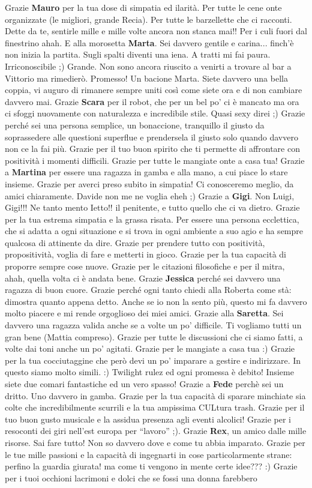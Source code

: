\documentclass[10pt]{amsart}
\newcommand{\n}[1]{{\Large \bf #1}}
\begin{document}
Grazie \n{Mauro} per la tua dose di simpatia ed ilarità. Per tutte le cene onte organizzate (le migliori, grande Recia). Per tutte le barzellette che ci racconti. Dette da te, sentirle mille e mille volte ancora non stanca mai!! Per i culi fuori dal finestrino ahah. E alla morosetta \n{Marta}. Sei davvero gentile e carina... finch'è non inizia la partita. Sugli spalti diventi una iena. A tratti mi fai paura. Irriconoscibile ;) Grande. Non sono ancora riuscito a venirti a trovare al bar a Vittorio ma rimedierò. Promesso! Un bacione Marta. Siete davvero una bella coppia, vi auguro di rimanere sempre uniti così come siete ora e di non cambiare davvero mai. 
Grazie \n{Scara} per il robot, che per un bel po' ci è mancato ma ora  ci sfoggi nuovamente con naturalezza e incredibile stile. Quasi sexy direi ;) Grazie perché sei una persona semplice, un bonaccione, tranquillo il giusto da soprassedere alle questioni superflue e prendersela il giusto solo quando davvero non ce la fai più. Grazie per il tuo buon spirito che ti permette di affrontare con positività i momenti difficili. Grazie per tutte le mangiate onte a casa tua! Grazie a \n{Martina} per essere una ragazza in gamba e alla mano, a cui piace lo stare insieme. Grazie per averci preso subito in simpatia! Ci conosceremo meglio, da amici chiaramente. Davide non me ne voglia eheh ;) Grazie a \n{Gigi}. Non Luigi, Gigi!!! Ne tanto mento Ietto!! il penitente, e tutto quello che ci va dietro. Grazie per la tua estrema simpatia e la grassa risata. Per essere una persona ecclettica, che si adatta a ogni situazione e si trova in ogni ambiente a suo agio e ha sempre qualcosa di attinente da dire. Grazie per prendere tutto con positività, propositività, voglia di fare e metterti in gioco. Grazie per la tua capacità di proporre sempre cose nuove. Grazie per le citazioni filosofiche e per il mitra, ahah, quella volta ci è andata bene.  Grazie \n{Jessica} perché sei davvero una ragazza di buon cuore. Grazie perché ogni tanto chiedi alla Roberta come stà: dimostra quanto appena detto. Anche se io non la sento più, questo mi fa davvero molto piacere e mi rende orgoglioso dei miei amici. Grazie alla \n{Saretta}. Sei davvero una ragazza valida anche se a volte un po' difficile. Ti vogliamo tutti un gran bene (Mattia compreso). Grazie per tutte le discussioni che ci siamo fatti, a volte dai toni anche un po' agitati. Grazie per le mangiate a casa tua :) Grazie per la tua cocciutaggine che però devi un po' imparare a gestire e indirizzare. In questo siamo molto simili. :) Twilight rulez ed ogni promessa è debito! Insieme siete due comari fantastiche ed un vero spasso!  Grazie a \n{Fede} perchè sei un dritto. Uno davvero in gamba. Grazie per la tua capacità di sparare minchiate sia colte che incredibilmente scurrili e la tua ampissima CULtura trash. Grazie per il tuo buon gusto musicale e la assidua presenza agli eventi alcolici! Grazie per i resoconti dei giri nell'est europa per ``lavoro'' ;). Grazie \n{Rex}, un amico dalle mille risorse. Sai fare tutto! Non so davvero dove e come tu abbia imparato. Grazie per le tue mille passioni e la capacità di ingegnarti in cose particolarmente strane: perfino la guardia giurata! ma come ti vengono in mente certe idee??? :) Grazie per i tuoi occhioni lacrimoni e dolci che se fossi una donna farebbero 
\end{document}
